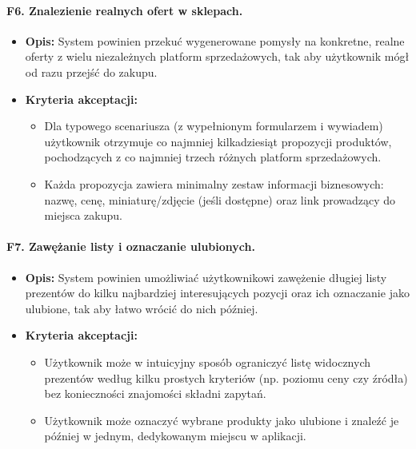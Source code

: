 \documentclass[12pt,a4paper]{article}
\begin{document}
\paragraph{F6. Znalezienie realnych ofert w sklepach.}
\begin{itemize}
    \item \textbf{Opis:} System powinien przekuć wygenerowane pomysły na konkretne, realne oferty z wielu niezależnych platform sprzedażowych, tak aby użytkownik mógł od razu przejść do zakupu.
    \item \textbf{Kryteria akceptacji:}
    \begin{itemize}
        \item Dla typowego scenariusza (z wypełnionym formularzem i wywiadem) użytkownik otrzymuje co najmniej kilkadziesiąt propozycji produktów, pochodzących z co najmniej trzech różnych platform sprzedażowych.
        \item Każda propozycja zawiera minimalny zestaw informacji biznesowych: nazwę, cenę, miniaturę/zdjęcie (jeśli dostępne) oraz link prowadzący do miejsca zakupu.
    \end{itemize}
\end{itemize}

\paragraph{F7. Zawężanie listy i oznaczanie ulubionych.}
\begin{itemize}
    \item \textbf{Opis:} System powinien umożliwiać użytkownikowi zawężenie długiej listy prezentów do kilku najbardziej interesujących pozycji oraz ich oznaczanie jako ulubione, tak aby łatwo wrócić do nich później.
    \item \textbf{Kryteria akceptacji:}
    \begin{itemize}
        \item Użytkownik może w intuicyjny sposób ograniczyć listę widocznych prezentów według kilku prostych kryteriów (np. poziomu ceny czy źródła) bez konieczności znajomości składni zapytań.
        \item Użytkownik może oznaczyć wybrane produkty jako ulubione i znaleźć je później w jednym, dedykowanym miejscu w aplikacji.
    \end{itemize}
\end{itemize}
\end{document}
